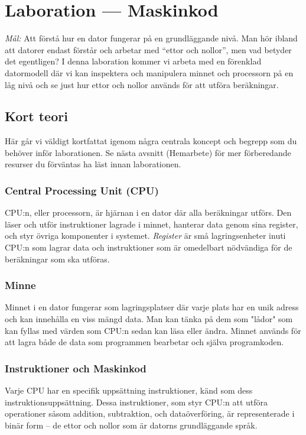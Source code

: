 
\section{Laboration  --- Maskinkod}

\emph{Mål:} Att förstå hur en dator fungerar på en grundläggande nivå. Man hör ibland att datorer endast förstår och arbetar med ``ettor och nollor'', men vad betyder det egentligen? I denna laboration kommer vi arbeta med en förenklad datormodell där vi kan inspektera och manipulera minnet och processorn på en låg nivå och se just hur ettor och nollor används för att utföra beräkningar.

\subsection{Kort teori}
Här går vi väldigt kortfattat igenom några centrala koncept och begrepp som du behöver inför laborationen. Se nästa avsnitt (Hemarbete) för mer förberedande resurser du förväntas ha läst innan laborationen.

\subsubsection{Central Processing Unit (CPU)}
CPU:n, eller processorn, är hjärnan i en dator där alla beräkningar utförs. Den läser och utför instruktioner lagrade i minnet, hanterar data genom sina register, och styr övriga komponenter i systemet. \emph{Register} är små lagringsenheter inuti CPU:n som lagrar data och instruktioner som är omedelbart nödvändiga för de beräkningar som ska utföras.

\subsubsection{Minne}
Minnet i en dator fungerar som lagringsplatser där varje plats har en unik adress och kan innehålla en viss mängd data. Man kan tänka på dem som "lådor" som kan fyllas med värden som CPU:n sedan kan läsa eller ändra. Minnet används för att lagra både de data som programmen bearbetar och själva programkoden.

\subsubsection{Instruktioner och Maskinkod}
Varje CPU har en specifik uppsättning instruktioner, känd som dess instruktionsuppsättning. Dessa instruktioner, som styr CPU:n att utföra operationer såsom addition, subtraktion, och dataöverföring, är representerade i binär form -- de ettor och nollor som är datorns grundläggande språk.

